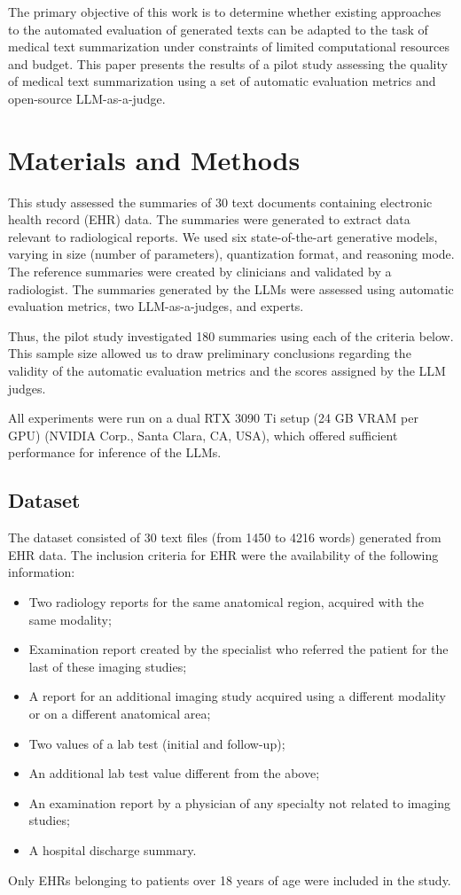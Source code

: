 \documentclass[runningheads]{llncs}
\begin{document}
The primary objective of this work is to determine whether existing approaches to the automated evaluation of generated texts can be adapted to the task of medical text summarization under constraints of limited computational resources and budget. This paper presents the results of a pilot study assessing the quality of medical text summarization using a set of automatic evaluation metrics and open-source LLM-as-a-judge.

\section{Materials and Methods}\label{sec:methods}

This study assessed the summaries of 30 text documents containing electronic health record (EHR) data. The summaries were generated to extract data relevant to radiological reports. We used six state-of-the-art generative models, varying in size (number of parameters), quantization format, and reasoning mode. The reference summaries were created by clinicians and validated by a radiologist. The summaries generated by the LLMs were assessed using automatic evaluation metrics, two LLM-as-a-judges, and experts.

Thus, the pilot study investigated 180 summaries using each of the criteria below. This sample size allowed us to draw preliminary conclusions regarding the validity of the automatic evaluation metrics and the scores assigned by the LLM judges.

All experiments were run on a dual RTX 3090 Ti setup (24 GB VRAM per GPU) (NVIDIA Corp., Santa Clara, CA, USA), which offered sufficient performance for inference of the LLMs.

\subsection{Dataset}\label{subsec:dataset}

The dataset consisted of 30 text files (from 1450 to 4216 words) generated from EHR data. The inclusion criteria for EHR were the availability of the following information:
\begin{itemize}
    \item Two radiology reports for the same anatomical region, acquired with the same modality;
    \item Examination report created by the specialist who referred the patient for the last of these imaging studies;
    \item A report for an additional imaging study acquired using a different modality or on a different anatomical area;
    \item Two values of a lab test (initial and follow-up);
    \item An additional lab test value different from the above;
    \item An examination report by a physician of any specialty not related to imaging studies;
    \item A hospital discharge summary.
\end{itemize}
Only EHRs belonging to patients over 18 years of age were included in the study.
\end{document}
